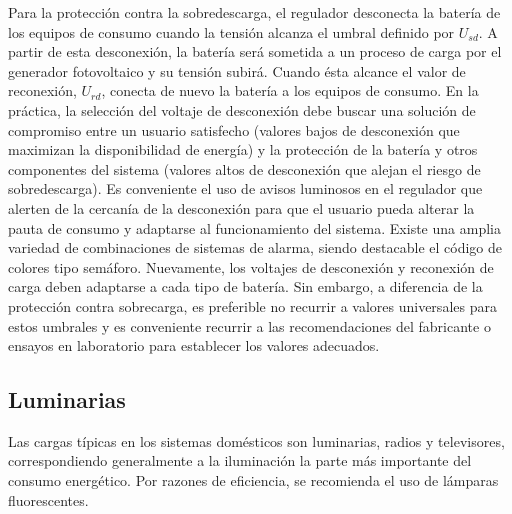 Para la protección contra la sobredescarga, el regulador desconecta
la batería de los equipos de consumo cuando la tensión alcanza el
umbral definido por $U_{sd}$.
A partir de esta desconexión, la batería será sometida a un proceso
de carga por el generador fotovoltaico y su tensión subirá. Cuando
ésta alcance el valor de reconexión, $U_{rd}$,
conecta de nuevo la batería a los equipos de consumo. En la práctica,
la selección del voltaje de desconexión debe buscar una solución de
compromiso entre un usuario satisfecho (valores bajos de desconexión
que maximizan la disponibilidad de energía) y la protección de la
batería y otros componentes del sistema (valores altos de desconexión
que alejan el riesgo de sobredescarga). Es conveniente el uso de avisos
luminosos en el regulador que alerten de la cercanía de la desconexión
para que el usuario pueda alterar la pauta de consumo y adaptarse
al funcionamiento del sistema. Existe una amplia variedad de combinaciones
de sistemas de alarma, siendo destacable el código de colores tipo
semáforo. Nuevamente, los voltajes de desconexión y reconexión de
carga deben adaptarse a cada tipo de batería. Sin embargo, a diferencia
de la protección contra sobrecarga, es preferible no recurrir a valores
universales para estos umbrales y es conveniente recurrir a las recomendaciones
del fabricante o ensayos en laboratorio para establecer los valores
adecuados. 


\subsection{Luminarias}

Las cargas típicas en los sistemas domésticos son luminarias, radios
y televisores, correspondiendo generalmente a la iluminación la parte
más importante del consumo energético. Por razones de eficiencia,
se recomienda el uso de lámparas fluorescentes.

